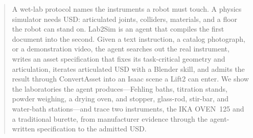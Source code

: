 \begin{abstract}
A wet-lab protocol names the instruments a robot must touch. A physics
simulator needs USD: articulated joints, colliders, materials, and a floor
the robot can stand on. Lab2Sim is an agent that compiles the first document
into the second. Given a text instruction, a catalog photograph, or a
demonstration video, the agent searches out the real instrument, writes an
asset specification that fixes its task-critical geometry and articulation,
iterates articulated USD with a Blender skill, and admits the result through
ConvertAsset into an Isaac scene a Lift2 can enter. We show the laboratories
the agent produces---Fehling baths, titration stands, powder weighing, a
drying oven, and stopper, glass-rod, stir-bar, and water-bath stations---and
trace two instruments, the IKA OVEN~125 and a traditional burette, from
manufacturer evidence through the agent-written specification to the admitted
USD.
\end{abstract}

